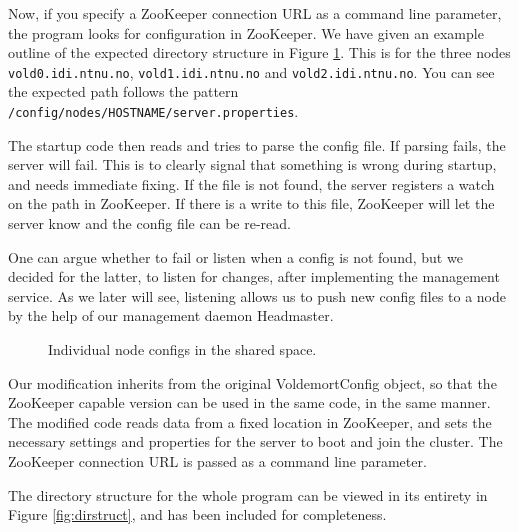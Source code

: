 Now, if you specify a ZooKeeper connection URL as a command line parameter, the program looks for configuration in ZooKeeper.
We have given an example outline of the expected directory structure in Figure \ref{fig:configdirs}. This is for the three nodes \texttt{vold0.idi.ntnu.no}, \texttt{vold1.idi.ntnu.no} and \texttt{vold2.idi.ntnu.no}. You can see the expected path follows the pattern \texttt{/config/nodes/HOSTNAME/server.properties}. 

The startup code then reads and tries to parse the config file. If parsing fails, the server will fail. This is to clearly signal that something is wrong during startup, and needs immediate fixing. If the file is not found, the server registers a watch on the path in ZooKeeper. If there is a write to this file, ZooKeeper will let the server know and the config file can be re-read. 

One can argue whether to fail or listen when a config is not found, but we decided for the latter, to listen for changes, after implementing the management service. As we later will see, listening allows us to push new config files to a node by the help of our management daemon Headmaster. 

\begin{figure}[h]
\caption{Individual node configs in the shared space.}
\label{fig:configdirs}
\end{figure}

Our modification inherits from the original VoldemortConfig object, so that the ZooKeeper capable version can be used in the same code, in the same manner. The modified code reads data from a fixed location in ZooKeeper, and sets the necessary settings and properties for the server to boot and join the cluster. The ZooKeeper connection URL is passed as a command line parameter.

The directory structure for the whole program can be viewed in its entirety in Figure \ref{fig:dirstruct}, and has been included for completeness.

